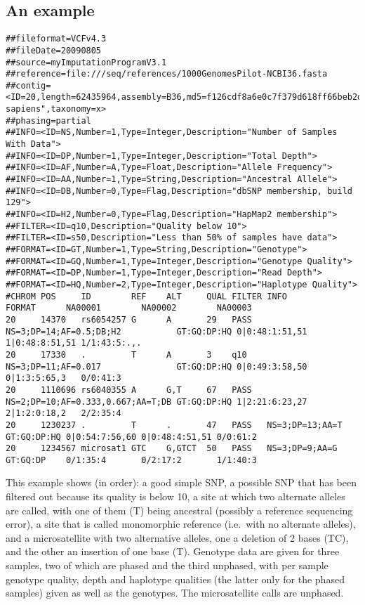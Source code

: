 \documentclass[8pt]{article}
\begin{document}
\subsection{An example}
\scriptsize
\begin{verbatim}
##fileformat=VCFv4.3
##fileDate=20090805
##source=myImputationProgramV3.1
##reference=file:///seq/references/1000GenomesPilot-NCBI36.fasta
##contig=<ID=20,length=62435964,assembly=B36,md5=f126cdf8a6e0c7f379d618ff66beb2da,species="Homo sapiens",taxonomy=x>
##phasing=partial
##INFO=<ID=NS,Number=1,Type=Integer,Description="Number of Samples With Data">
##INFO=<ID=DP,Number=1,Type=Integer,Description="Total Depth">
##INFO=<ID=AF,Number=A,Type=Float,Description="Allele Frequency">
##INFO=<ID=AA,Number=1,Type=String,Description="Ancestral Allele">
##INFO=<ID=DB,Number=0,Type=Flag,Description="dbSNP membership, build 129">
##INFO=<ID=H2,Number=0,Type=Flag,Description="HapMap2 membership">
##FILTER=<ID=q10,Description="Quality below 10">
##FILTER=<ID=s50,Description="Less than 50% of samples have data">
##FORMAT=<ID=GT,Number=1,Type=String,Description="Genotype">
##FORMAT=<ID=GQ,Number=1,Type=Integer,Description="Genotype Quality">
##FORMAT=<ID=DP,Number=1,Type=Integer,Description="Read Depth">
##FORMAT=<ID=HQ,Number=2,Type=Integer,Description="Haplotype Quality">
#CHROM POS     ID        REF    ALT     QUAL FILTER INFO                              FORMAT      NA00001        NA00002        NA00003
20     14370   rs6054257 G      A       29   PASS   NS=3;DP=14;AF=0.5;DB;H2           GT:GQ:DP:HQ 0|0:48:1:51,51 1|0:48:8:51,51 1/1:43:5:.,.
20     17330   .         T      A       3    q10    NS=3;DP=11;AF=0.017               GT:GQ:DP:HQ 0|0:49:3:58,50 0|1:3:5:65,3   0/0:41:3
20     1110696 rs6040355 A      G,T     67   PASS   NS=2;DP=10;AF=0.333,0.667;AA=T;DB GT:GQ:DP:HQ 1|2:21:6:23,27 2|1:2:0:18,2   2/2:35:4
20     1230237 .         T      .       47   PASS   NS=3;DP=13;AA=T                   GT:GQ:DP:HQ 0|0:54:7:56,60 0|0:48:4:51,51 0/0:61:2
20     1234567 microsat1 GTC    G,GTCT  50   PASS   NS=3;DP=9;AA=G                    GT:GQ:DP    0/1:35:4       0/2:17:2       1/1:40:3
\end{verbatim}
\normalsize
This example shows (in order): a good simple SNP, a possible SNP that has been filtered out because its quality is below 10, a site at which two alternate alleles are called, with one of them (T) being ancestral (possibly a reference sequencing error), a site that is called monomorphic reference (i.e.\ with no alternate alleles), and a microsatellite with two alternative alleles, one a deletion of 2 bases (TC), and the other an insertion of one base (T).
Genotype data are given for three samples, two of which are phased and the third unphased, with per sample genotype quality, depth and haplotype qualities (the latter only for the phased samples) given as well as the genotypes.
The microsatellite calls are unphased.
\end{document}
